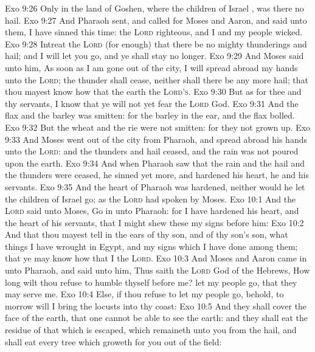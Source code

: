 \vs Exo 9:26 Only in the land of Goshen, where the children of Israel , was there no hail.
\vs Exo 9:27 And Pharaoh sent, and called for Moses and Aaron, and said unto them, I have sinned this time: the \textsc{Lord}  righteous, and I and my people  wicked.
\vs Exo 9:28 Intreat the \textsc{Lord} (for  enough) that there be no  mighty thunderings and hail; and I will let you go, and ye shall stay no longer.
\vs Exo 9:29 And Moses said unto him, As soon as I am gone out of the city, I will spread abroad my hands unto the \textsc{Lord};  the thunder shall cease, neither shall there be any more hail; that thou mayest know how that the earth  the \textsc{Lord's}.
\vs Exo 9:30 But as for thee and thy servants, I know that ye will not yet fear the \textsc{Lord} God.
\vs Exo 9:31 And the flax and the barley was smitten: for the barley  in the ear, and the flax  bolled.
\vs Exo 9:32 But the wheat and the rie were not smitten: for they  not grown up.
\vs Exo 9:33 And Moses went out of the city from Pharaoh, and spread abroad his hands unto the \textsc{Lord}: and the thunders and hail ceased, and the rain was not poured upon the earth.
\vs Exo 9:34 And when Pharaoh saw that the rain and the hail and the thunders were ceased, he sinned yet more, and hardened his heart, he and his servants.
\vs Exo 9:35 And the heart of Pharaoh was hardened, neither would he let the children of Israel go; as the \textsc{Lord} had spoken by Moses.
\vs Exo 10:1 And the \textsc{Lord} said unto Moses, Go in unto Pharaoh: for I have hardened his heart, and the heart of his servants, that I might shew these my signs before him:
\vs Exo 10:2 And that thou mayest tell in the ears of thy son, and of thy son's son, what things I have wrought in Egypt, and my signs which I have done among them; that ye may know how that I  the \textsc{Lord}.
\vs Exo 10:3 And Moses and Aaron came in unto Pharaoh, and said unto him, Thus saith the \textsc{Lord} God of the Hebrews, How long wilt thou refuse to humble thyself before me? let my people go, that they may serve me.
\vs Exo 10:4 Else, if thou refuse to let my people go, behold, to morrow will I bring the locusts into thy coast:
\vs Exo 10:5 And they shall cover the face of the earth, that one cannot be able to see the earth: and they shall eat the residue of that which is escaped, which remaineth unto you from the hail, and shall eat every tree which groweth for you out of the field:

